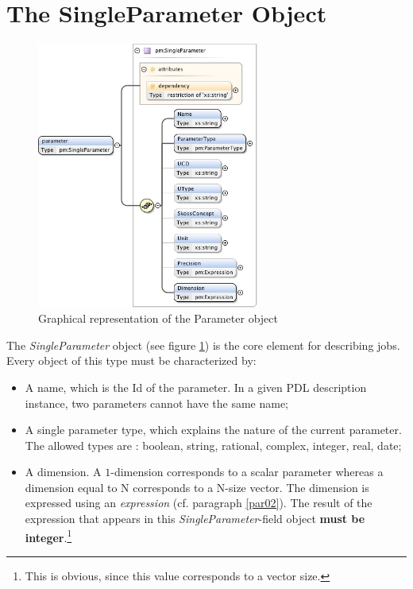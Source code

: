 \documentclass[a4paper,11pt] {ivoa}
\begin{document}
\section{The SingleParameter Object}\label{par01}

\begin{figure}[htbp]
\begin{center}
\includegraphics[width=0.65\textwidth]{pictures/Parameter.jpg} 
\caption{Graphical representation of the Parameter object}
\label{Pic-Parameter}
\end{center}
\end{figure}

The {\it SingleParameter} object (see figure \ref{Pic-Parameter}) is the core element for describing
jobs.
Every object of this type must be characterized by:
\begin{itemize}
\item A name, which is the Id of the parameter. In a given PDL description instance, two parameters cannot 
have the same name;
\item A single parameter type, which explains the nature of the current parameter. The allowed
types are : boolean, string, rational, complex, integer, real, date;
\item A dimension. A $1$-dimension corresponds to a scalar parameter whereas a dimension
equal to N corresponds to a N-size vector. The dimension is expressed using an {\it expression} (cf.
paragraph \ref{par02}). The result of the expression that appears in this {\it
SingleParameter}-field object {\bf must be integer}.\footnote{This is obvious, since this value
corresponds to a vector size.}
\end{itemize}
\end{document}
